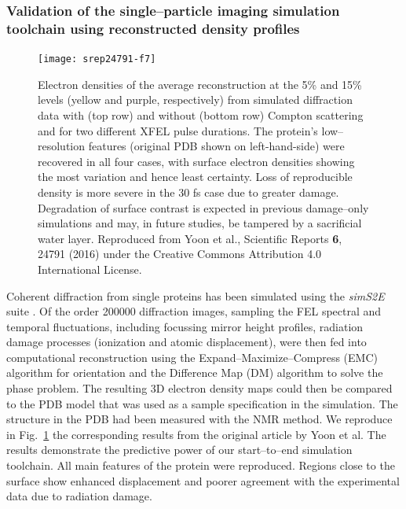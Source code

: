 \documentclass[10pt]{scrartcl}
\begin{document}
\subsubsection{Validation of the single--particle imaging simulation toolchain
using reconstructed density profiles}%
%
\begin{figure}[ht]
  \begin{center}
    \texttt{[image: srep24791-f7]}
  \end{center}
  \caption{Electron densities of the average reconstruction at the 5\% and 15\%
    levels (yellow and purple, respectively) from simulated diffraction data with
    (top row) and without (bottom row) Compton scattering and for two different
    XFEL pulse durations. The protein's low--resolution features (original PDB
    shown on left-hand-side) were recovered in
    all four cases, with surface electron densities showing the most variation and
    hence least certainty. Loss of reproducible density is more severe in the
    30 fs case due to greater damage. Degradation of surface contrast is
    expected in
    previous damage--only simulations and may, in future studies, be tampered by a
    sacrificial water layer\cite{Hau-Riege2004}. Reproduced
    from Yoon et al., Scientific Reports \textbf{6}, 24791 (2016) under the
    Creative Commons Attribution 4.0 International License.
  }
  \label{fig:2NIP_reconstruction}
\end{figure}

Coherent diffraction from single proteins has been simulated using the
\textit{simS2E} suite \cite{Yoon2016}. Of the order 200000 diffraction images,
sampling the FEL spectral and temporal fluctuations, including focussing
mirror height profiles, radiation damage processes (ionization and atomic
displacement), were then fed into computational reconstruction using the
Expand--Maximize--Compress (EMC) algorithm for orientation and the
Difference Map (DM) algorithm to solve the phase problem. The resulting 3D
electron density maps could then be compared to the PDB model that was used as
a sample specification in the simulation. The structure in the PDB had been
measured with the NMR method. We reproduce in Fig.~\ref{fig:2NIP_reconstruction}
the corresponding results from the original article by Yoon et al.
The results demonstrate the predictive power of our start--to--end simulation
toolchain. All main features of the protein were reproduced. Regions close to
the surface show enhanced displacement and poorer agreement with the
experimental data due to radiation damage.
%
\end{document}
